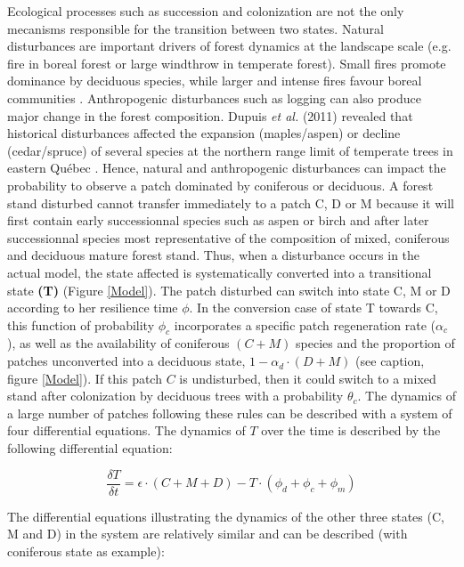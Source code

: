 Ecological processes such as succession and colonization are not the only
mecanisms responsible for the transition between two states. Natural
disturbances are important drivers of forest dynamics at the landscape scale
(e.g. fire in boreal forest or large windthrow in temperate forest). Small
fires promote dominance by deciduous species, while larger and intense fires
favour boreal communities \cite{Bergeron2004}. Anthropogenic disturbances such
as logging can also produce major change in the forest composition. Dupuis
\textit{et al.} (2011) revealed that historical disturbances affected the
expansion (maples/aspen) or decline (cedar/spruce) of several species at the
northern range limit of temperate trees in eastern Québec \cite{Dupuis2011}.
Hence, natural and anthropogenic disturbances can impact the probability to
observe a patch dominated by coniferous or deciduous. A forest stand disturbed
cannot transfer immediately to a patch C, D or M because it will first contain
early successionnal species such as aspen or birch and after later
successionnal species most representative of the composition of mixed,
coniferous and deciduous mature forest stand. Thus, when a disturbance occurs
in the actual model, the state affected is systematically converted into a
transitional state \textbf{(T)} (Figure \ref{Model}).  The patch disturbed can
switch into state C, M or D according to her resilience time $\phi$. In the
conversion case of state T towards C, this function of probability $\phi_c$
incorporates a specific patch regeneration rate ($\alpha_c$), as well as the
availability of coniferous $(C + M)$ species and the proportion of patches
unconverted into a deciduous state, $1- \alpha_d \cdot (D + M)$ (see caption,
figure \ref{Model}). If this patch $C$ is undisturbed, then it could switch to
a mixed stand after colonization by deciduous trees with a probability
$\theta_c$. The dynamics of a large number of patches following these rules
can be described with a system of four differential equations. The dynamics of
$T$ over the time is described by the following differential equation:


\begin{equation}
 	\frac{\delta T}{\delta t} =\epsilon \cdot (C+M+D) - T \cdot (\phi_d + \phi_c + \phi_m)
\end{equation}

The differential equations illustrating the dynamics of the other three states
(C, M and D) in the system are relatively similar and can be described (with
coniferous state as example):


